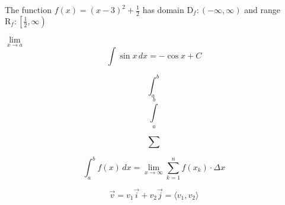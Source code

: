 \documentclass[16pt]{article}
\begin{document}
The function $f(x)=(x-3)^2+\frac{1}{2}$ has domain $\mathrm{D}_f:(-\infty,\infty)$ and range $\mathrm{R}_f:\left[\frac{1}{2},\infty\right)
$




$\lim\limits_{x \to a}$\\


$$ \displaystyle{\int \sin x \,dx=-\cos x +C} $$


$$\int_a^b$$
$$\int\limits_a^b$$



$$\sum$$


$$\displaystyle{\int_a^b f(x) \,dx=\lim \limits_{x\to\infty}\sum \limits_{k=1}^{n}f(x_k)\cdot \Delta x}$$

$$\vec{v}=v_1 \vec{i}+v_2\vec{j}=\langle v_1,v_2\rangle$$
\end{document}
